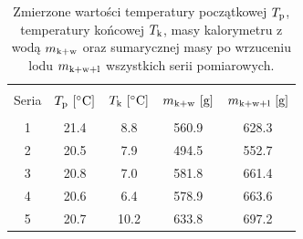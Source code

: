 \begin{table}[htb]
\begin{center}
\renewcommand*{\tablename}{Tabela}
\caption{\small
Zmierzone wartości temperatury początkowej $ T_{\mathrm{p}} $, temperatury końcowej $ T_{\mathrm{k}} $, masy kalorymetru z wodą $ m_{\mathrm{k+w}} $ oraz sumarycznej masy po wrzuceniu lodu $ m_{\mathrm{k+w+l}} $ wszystkich serii pomiarowych.
\vspace{0.15cm}
    \label{tab:pomiary}}
    {\small
    \begin{tabular}{c c c c c}
    \hline \vspace{-0.35cm} \\
      Seria & $ T_{\mathrm{p}} ~[ \mathrm{^{\circ}C} ]$ & $ T_{\mathrm{k}} ~[ \mathrm{^{\circ}C} ]$
      & $ m_{\mathrm{k+w}} ~[\mathrm{g}]$ & $ m_{\mathrm{k+w+l}} ~[\mathrm{g}]$ \\
      \hline \vspace{-0.2cm} \\
      1 & 21.4 & 8.8 & 560.9 & 628.3 \\
      2 & 20.5 & 7.9 & 494.5 & 552.7 \\
      3 & 20.8 & 7.0 & 581.8 & 661.4 \\
      4 & 20.6 & 6.4 & 578.9 & 663.6 \\
      5 & 20.7 & 10.2 & 633.8 & 697.2 \\
    \hline
    \end{tabular}}
    \end{center}
\end{table}
